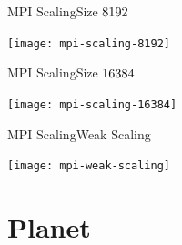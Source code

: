 \documentclass{beamer}
\begin{document}
\begin{frame}{MPI Scaling}{Size $8192 \time 8192$}
    \begin{center}
        \texttt{[image: mpi-scaling-8192]}
    \end{center}
\end{frame}

\begin{frame}{MPI Scaling}{Size $16384 \time 16384$}
    \begin{center}
        \texttt{[image: mpi-scaling-16384]}
    \end{center}
\end{frame}

\begin{frame}{MPI Scaling}{Weak Scaling}
    \begin{center}
        \texttt{[image: mpi-weak-scaling]}
    \end{center}
\end{frame}

\section{Planet}
\end{document}
